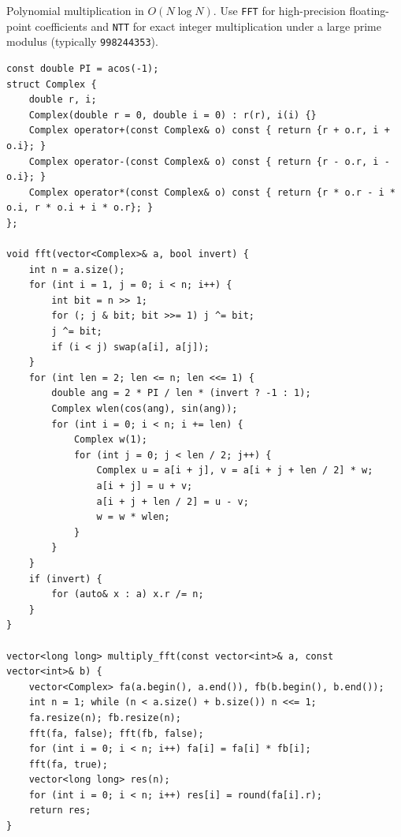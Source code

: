 
Polynomial multiplication in $O(N \log N)$. Use \lstinline|FFT| for high-precision floating-point coefficients and \lstinline|NTT| for exact integer multiplication under a large prime modulus (typically \lstinline|998244353|).

\begin{lstlisting}
const double PI = acos(-1);
struct Complex {
    double r, i;
    Complex(double r = 0, double i = 0) : r(r), i(i) {}
    Complex operator+(const Complex& o) const { return {r + o.r, i + o.i}; }
    Complex operator-(const Complex& o) const { return {r - o.r, i - o.i}; }
    Complex operator*(const Complex& o) const { return {r * o.r - i * o.i, r * o.i + i * o.r}; }
};

void fft(vector<Complex>& a, bool invert) {
    int n = a.size();
    for (int i = 1, j = 0; i < n; i++) {
        int bit = n >> 1;
        for (; j & bit; bit >>= 1) j ^= bit;
        j ^= bit;
        if (i < j) swap(a[i], a[j]);
    }
    for (int len = 2; len <= n; len <<= 1) {
        double ang = 2 * PI / len * (invert ? -1 : 1);
        Complex wlen(cos(ang), sin(ang));
        for (int i = 0; i < n; i += len) {
            Complex w(1);
            for (int j = 0; j < len / 2; j++) {
                Complex u = a[i + j], v = a[i + j + len / 2] * w;
                a[i + j] = u + v;
                a[i + j + len / 2] = u - v;
                w = w * wlen;
            }
        }
    }
    if (invert) {
        for (auto& x : a) x.r /= n;
    }
}

vector<long long> multiply_fft(const vector<int>& a, const vector<int>& b) {
    vector<Complex> fa(a.begin(), a.end()), fb(b.begin(), b.end());
    int n = 1; while (n < a.size() + b.size()) n <<= 1;
    fa.resize(n); fb.resize(n);
    fft(fa, false); fft(fb, false);
    for (int i = 0; i < n; i++) fa[i] = fa[i] * fb[i];
    fft(fa, true);
    vector<long long> res(n);
    for (int i = 0; i < n; i++) res[i] = round(fa[i].r);
    return res;
}
\end{lstlisting}

